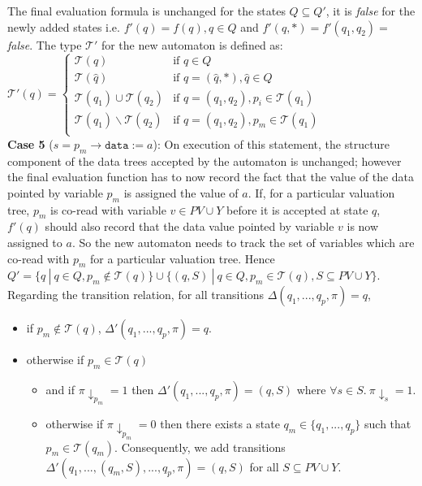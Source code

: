 \documentclass{llncs}
\newcommand{\data}{\texttt{data}}
\begin{document}
The final evaluation formula is unchanged for the states $Q \subseteq Q'$, it is \emph{false} for the newly added states i.e. $f'(q) = f(q), q \in Q$ and $f'(q,*) = f'(q_1, q_2) =$ \emph{false}. The type $\mathcal{T'}$ for the new automaton is defined as:\\
$\mathcal{T'}(q) = \begin{cases}
        \mathcal{T}(q) & \text{if $q \in Q$ }\\
	  \mathcal{T}(\hat{q})  & \text{if $q = (\hat{q},*), \hat{q} \in Q$ }\\
	  \mathcal{T}(q_1) \cup \mathcal{T}(q_2) & \text{if $q = (q_1, q_2),  p_i \in \mathcal{T}(q_1)$}\\
	  \mathcal{T}(q_1) \backslash \mathcal{T}(q_2) & \text{if $q = (q_1, q_2), p_m \in \mathcal{T}(q_1)$}\\
      \end{cases}
$\\
\newline\newline
{\bf Case 5} ($s = p_m \rightarrow\data := a$): On execution of this statement, the structure component of the data trees accepted by the automaton is unchanged; however the final evaluation function has to now record the fact that the value of the data pointed by variable $p_m$ is assigned  the value of $a$. If, for a particular valuation tree, $p_m$ is co-read with variable $v \in PV \cup Y$ before it is accepted at state $q$, $f'(q)$ should also record that  the data value pointed by variable $v$  is now assigned to $a$. So the new automaton needs to track the set of variables which are co-read with $p_m$ for a particular valuation tree. Hence $Q' = \{q~|~q \in Q, p_m \notin \mathcal{T}(q)\} \cup \{(q, S)~|~q \in Q, p_m \in \mathcal{T}(q), S \subseteq PV \cup Y\}$. Regarding the transition relation, for all transitions $\Delta(q_1, ..., q_p, \pi) = q$,
\begin{itemize}
\item if $p_m \notin \mathcal{T}(q)$, $\Delta'(q_1, ..., q_p, \pi) =  q$.
\item otherwise if $p_m \in \mathcal{T}(q)$ 
	\begin{itemize}
	\item and if $\pi \downarrow_{p_m} = 1$ then $\Delta'(q_1, ..., q_p, \pi) =  (q, S)$ where $\forall s \in S.~ \pi \downarrow_s = 1$. \item otherwise if $\pi \downarrow_{p_m} = 0$ then there exists a state $q_m \in \{q_1, ..., q_p\}$ such that $p_m \in \mathcal{T}(q_m)$. Consequently, we add transitions $\Delta'(q_1, ..., (q_m, S), ... , q_p, \pi) = (q, S)$ for all $S \subseteq PV \cup Y$.
	\end{itemize}
\end{itemize}
\end{document}
